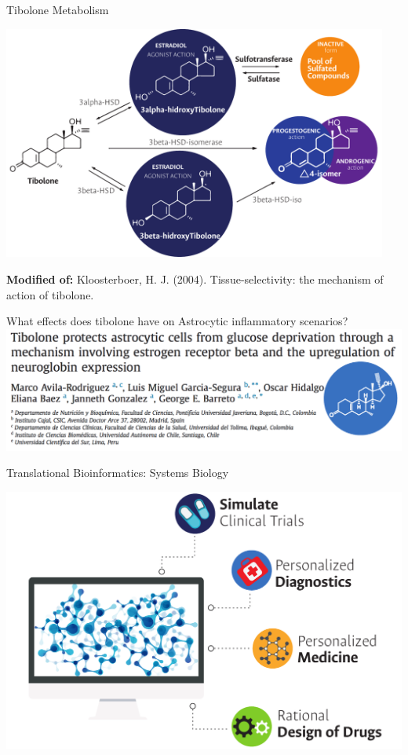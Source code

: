 \documentclass[11pt]{beamer}
\begin{document}
\begin{frame}{Tibolone Metabolism}
\begin{center}
\includegraphics[width=0.95\textwidth]{TiboloneM}
\end{center}
{\scriptsize \textbf{Modified of:} Kloosterboer, H. J. (2004). Tissue-selectivity: the mechanism of action of tibolone.\\}
\end{frame}
\begin{frame}{What effects does tibolone have on Astrocytic inflammatory scenarios?}
\includegraphics[width=\textwidth]{Tibolone}
\end{frame}
\begin{frame}{Translational Bioinformatics: Systems Biology}
\begin{center}
\includegraphics[width=\textwidth]{TMedicine}
\end{center}
\end{frame}
\end{document}
